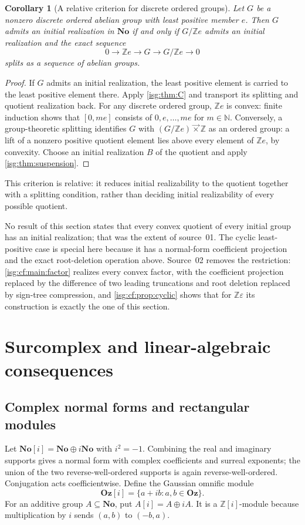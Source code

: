 \documentclass[11pt]{article}
\newtheorem{corollary}[corollary]{Corollary}
\theoremstyle{definition}
\theoremstyle{remark}
\newcommand{\No}{\ensuremath{\mathbf{No}}}
\newcommand{\Oz}{\ensuremath{\mathbf{Oz}}}
\newcommand{\Z}{\mathbb{Z}}
\newcommand{\N}{\mathbb{N}}
\newcommand{\lex}{\mathbin{\overrightarrow{\times}}}
\begin{document}
\begin{corollary}[A relative criterion for discrete ordered groups]\label{isg:cor:relative}
Let $G$ be a nonzero discrete ordered abelian group with least positive
member $e$. Then $G$ admits an initial realization in $\No$ if and only
if $G/\Z e$ admits an initial realization and the exact sequence
\[
 0\longrightarrow\Z e\longrightarrow G
   \longrightarrow G/\Z e\longrightarrow0
\]
splits as a sequence of abelian groups.
\end{corollary}
\begin{proof}
If $G$ admits an initial realization, the least positive element is
carried to the least positive element there. Apply
\cref{isg:thm:C} and transport its splitting and quotient realization back.
For any discrete ordered group, $\Z e$ is convex: finite induction
shows that $[0,me]$ consists of $0,e,\ldots,me$ for $m\in\N$.
Conversely, a group-theoretic splitting identifies $G$ with
$(G/\Z e)\lex\Z$ as an ordered group: a lift of a nonzero positive
quotient element lies above every element of $\Z e$, by convexity.
Choose an initial realization $B$ of the quotient and apply
\cref{isg:thm:suspension}.
\end{proof}

This criterion is relative: it reduces initial realizability to the
quotient together with a splitting condition, rather than deciding
initial realizability of every possible quotient.

No result of this section states that every convex quotient of every
initial group has an initial realization; that was the extent of
source~01. The cyclic least-positive case is special here because it has
a normal-form coefficient projection and the exact root-deletion
operation above. Source~02 removes the restriction:
\cref{isg:cf:main:factor} realizes every convex factor, with the
coefficient projection replaced by the difference of two leading
truncations and root deletion replaced by sign-tree compression, and
\cref{isg:cf:prop:cyclic} shows that for $\Z\varepsilon$ its construction
is exactly the one of this section.

\section{Surcomplex and linear-algebraic consequences}\label{isg:sec:complex}

\subsection{Complex normal forms and rectangular modules}
Let $\No[i]=\No\oplus i\No$ with $i^2=-1$. Combining the real and
imaginary supports gives a normal form with complex coefficients and
surreal exponents; the union of the two reverse-well-ordered supports is
again reverse-well-ordered. Conjugation acts coefficientwise.
Define the Gaussian omnific module
\[
 \Oz[i]=\{a+ib:a,b\in\Oz\}.
\]
For an additive group $A\subseteq\No$, put
$A[i]=A\oplus iA$. It is a $\Z[i]$-module because multiplication by
$i$ sends $(a,b)$ to $(-b,a)$.
\end{document}
